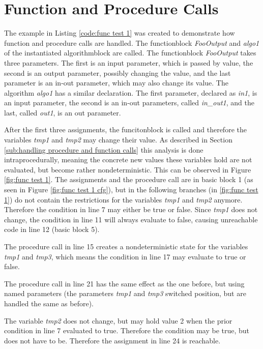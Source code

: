 \section{Function and Procedure Calls}
The example in Listing \ref{code:func test 1} was created to demonstrate how function and procedure calls are handled. The functionblock \emph{FooOutput} and \emph{algo1} of the instantiated algorithmblock are called. The functionblock \emph{FooOutput} takes three parameters. The first is an input parameter, which is passed by value, the second is an output parameter, possibly changing the value, and the last parameter is an in-out parameter, which may also change its value.
The algorithm \emph{algo1} has a similar declaration. The first parameter, declared as \emph{in1}, is an input parameter, the second is an in-out parameters, called \emph{in\_out1}, and the last, called \emph{out1}, is an out parameter.

After the first three assignments, the funcitonblock is called and therefore the variables \emph{tmp1} and \emph{tmp2} may change their value. As described in Section \ref{sub:handling procedure and function calls} this analysis is done intraprocedurally, meaning the concrete new values these variables hold are not evaluated, but become rather nondeterministic. This can be observed in Figure \ref{fig:func test 1}. The assignments and the procedure call are in basic block 1 (as seen in Figure \ref{fig:func test 1 cfg}), but in the following branches (in \ref{fig:func test 1}) do not contain the restrictions for the variables \emph{tmp1} and \emph{tmp2} anymore. Therefore the condition in line 7 may either be true or false.
Since \emph{tmp1} does not change,  the condition in line 11 will always evaluate to false, causing unreachable code in line 12 (basic block 5).

The procedure call in line 15 creates a nondeterministic state for the variables \emph{tmp1} and \emph{tmp3}, which means the condition in line 17 may evaluate to true or false.

The procedure call in line 21 has the same effect as the one before, but using named parameters (the parameters \emph{tmp1} and \emph{tmp3} switched position, but are handled the same as before).

The variable \emph{tmp2} does not change, but may hold value 2 when the prior condition in line 7 evaluated to true. Therefore the condition may be true, but does not have to be. Therefore the assignment in line 24 is reachable. 

